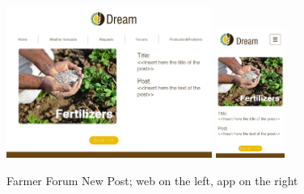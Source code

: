 \documentclass{article}
\begin{document}
        \begin{figure} [h]
            \centering
            \includegraphics[width=0.6\textwidth]{images/UserInterfaces/Farmer/Forum/NewPostWeb.png}
            \quad
            \includegraphics[width=0.2\textwidth]{images/UserInterfaces/Farmer/Forum/NewPostApp.png}
            \quad
            \caption{\label{fig:farmerForumNewPost}Farmer Forum New Post; web on the left, app on the right}
        \end{figure}
        \newpage
\end{document}
